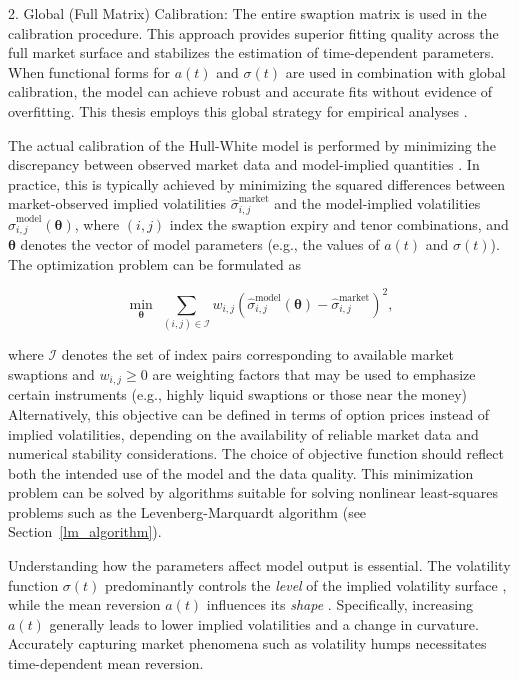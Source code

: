 2. Global (Full Matrix) Calibration: The entire swaption matrix is used in the calibration procedure. This approach provides superior fitting quality across the full market surface and stabilizes the estimation of time-dependent parameters. When functional forms for $a(t)$ and $\sigma(t)$ are used in combination with global calibration, the model can achieve robust and accurate fits without evidence of overfitting. This thesis employs this global strategy for empirical analyses \parencite[pp.~24--29]{gurrieri2009calibration}.

The actual calibration of the Hull-White model is performed by minimizing the discrepancy between observed market data and model-implied quantities \parencite[p.~2]{alaya2021deep}. In practice, this is typically achieved by minimizing the squared differences between market-observed implied volatilities $\hat{\sigma}^{\text{market}}_{i,j}$ and the model-implied volatilities $\hat{\sigma}^{\text{model}}_{i,j}(\boldsymbol{\theta})$, where $(i,j)$ index the swaption expiry and tenor combinations, and $\boldsymbol{\theta}$ denotes the vector of model parameters (e.g., the values of $a(t)$ and $\sigma(t)$). The optimization problem can be formulated as

\begin{equation}
	\min_{\boldsymbol{\theta}} \; \sum_{(i,j) \in \mathcal{I}} w_{i,j} \left( \hat{\sigma}^{\text{model}}_{i,j}(\boldsymbol{\theta}) - \hat{\sigma}^{\text{market}}_{i,j} \right)^2,
\end{equation}

where $\mathcal{I}$ denotes the set of index pairs corresponding to available market swaptions and $w_{i,j} \geq 0$ are weighting factors that may be used to emphasize certain instruments (e.g., highly liquid swaptions or those near the money)  Alternatively, this objective can be defined in terms of option prices instead of implied volatilities, depending on the availability of reliable market data and numerical stability considerations. The choice of objective function should reflect both the intended use of the model and the data quality. This minimization problem can be solved by algorithms suitable for solving nonlinear least-squares problems such as the Levenberg-Marquardt algorithm (see Section~\ref{lm_algorithm}).

Understanding how the parameters affect model output is essential. The volatility function $\sigma(t)$ predominantly controls the \emph{level} of the implied volatility surface \parencite[p.~9]{gurrieri2009calibration}, while the mean reversion $a(t)$ influences its \emph{shape} \parencite[p.~9]{gurrieri2009calibration}. Specifically, increasing $a(t)$ generally leads to lower implied volatilities and a change in curvature. Accurately capturing market phenomena such as volatility humps necessitates time-dependent mean reversion.

